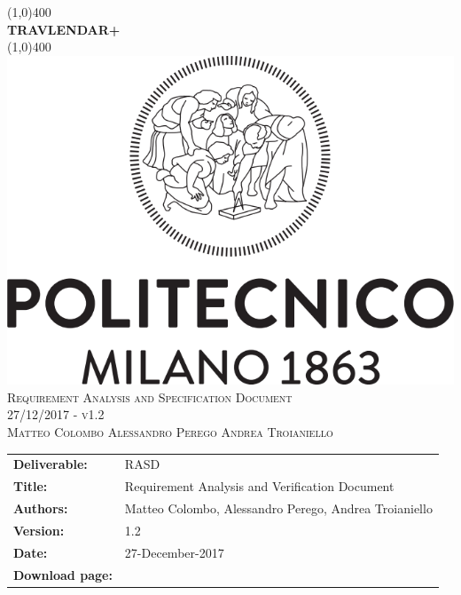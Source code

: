 



\begin{titlepage}
	\begin{center}
		\line(1,0){400}\\	[0.6cm]
		\Huge{\bfseries{TRAVLENDAR+}}\\
		\line(1,0){400}\\
		[3cm]
		\includegraphics[scale=0.3]{Images/polimi}\\
		[3cm]
		\textsc{\Huge Requirement Analysis and Specification Document}\\[1cm]
		\textsc{\huge 27/12/2017 - v1.2}\\
		[4cm]
		\textsc{\normalsize Matteo Colombo \hspace{0.4cm} Alessandro Perego \hspace{0.4cm} Andrea Troianiello }
	\end{center}
\end{titlepage}
	
\begin{table}[h!]
\begin{tabu} to \textwidth { X[0.3,r,p] X[0.7,l,p] }
\hline

\textbf{Deliverable:} & RASD\\
\textbf{Title:} & Requirement Analysis and Verification Document \\
\textbf{Authors:} & Matteo Colombo, Alessandro Perego, Andrea Troianiello \\
\textbf{Version:} & 1.2 \\ 
\textbf{Date:} & 27-December-2017 \\
\textbf{Download page:} & \href{https://github.com/MatteoColombo/ColomboPeregoTroianiello}{\color{Black}{GitHub - ColomboPeregoTroianiello repository}} \\
\hline
\end{tabu}
\end{table}

